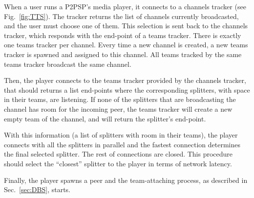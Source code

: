When a user runs a P2PSP's media player, it connects to a channels
tracker (see Fig.~\ref{fig:TTS}). The tracker returns the list of
channels currently broadcasted, and the user must choose one of
them. This selection is sent back to the channels tracker, which
responds with the end-point of a teams tracker. There is exactly one
teams tracker per channel. Every time a new channel is created, a new
teams tracker is spawned and assigned to this channel. All teams
tracked by the same teams tracker broadcast the same channel.

Then, the player connects to the teams tracker provided by the
channels tracker, that should returns a list end-points where the
corresponding splitters, with space in their teams, are listening. If
none of the splitters that are broadcasting the channel has room for
the incoming peer, the teams tracker will create a new empty team of
the channel, and will return the splitter's end-point.

With this information (a list of splitters with room in their teams),
the player connects with all the splitters in parallel and the fastest
connection determines the final selected splitter. The rest of
connections are closed. This procedure should select the ``closest''
splitter to the player in terms of network latency.

Finally, the player spawns a peer and the team-attaching process, as
described in Sec.~\ref{sec:DBS}, starts.

